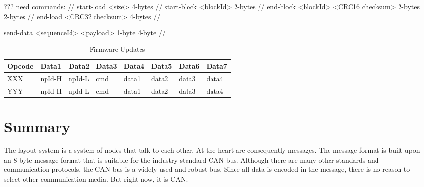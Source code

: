 ??? need commands: //
start-load <size>  4-bytes //
start-block <blockId> 2-bytes //
end-block <blockId> <CRC16 checksum> 2-bytes 2-bytes //
end-load <CRC32 checksum> 4-bytes //

send-data <sequenceId> <payload> 1-byte 4-byte //


\begin{table}[ht!]
    \begin{center}
        \caption{Firmware Updates}
        \begin{tabular}{|l|l|l|l|l|l|l|l|}
            \toprule
            \textbf{Opcode}  & \textbf{Data1} & \textbf{Data2} & \textbf{Data3} & \textbf{Data4} & \textbf{Data5} & \textbf{Data6} & \textbf{Data7} \\
            \midrule
            XXX & npId-H & npId-L & cmd & data1 & data2 & data3 & data4 \\
            YYY & npId-H & npId-L & cmd & data1 & data2 & data3 & data4 \\
            \bottomrule
        \end{tabular}
    \end{center}
\end{table}

\section{Summary}

The layout system is a system of nodes that talk to each other. At the heart are consequently messages. The message format is built upon an 8-byte message format that is suitable for the industry standard CAN bus. Although there are many other standards and communication protocols, the CAN bus is a widely used and robust bus. Since all data is encoded in the message, there is no reason to select other communication media. But right now, it is CAN.


